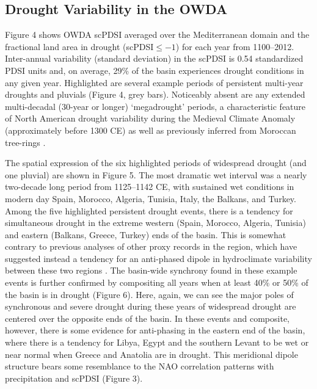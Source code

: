\documentclass[draft,jgr]{AGUTeX}
\begin{document}
\begin{article}
\subsection{Drought Variability in the OWDA}
\noindent Figure 4 shows OWDA scPDSI averaged over the Mediterranean domain and the fractional land area in drought (scPDSI$\le-1$) for each year from 1100--2012. Inter-annual variability (standard deviation) in the scPDSI is 0.54 standardized PDSI units and, on average, 29\% of the basin experiences drought conditions in any given year. Highlighted are several example periods of persistent multi-year droughts and pluvials (Figure 4, grey bars). Noticeably absent are any extended multi-decadal (30-year or longer) `megadrought' periods, a characteristic feature of North American drought variability during the Medieval Climate Anomaly (approximately before 1300 CE) \citep[e.g.,][]{CookER2010b} as well as previously inferred from Moroccan tree-rings \citep{Esper:etal2007a}.

\indent The spatial expression of the six highlighted periods of widespread drought (and one pluvial) are shown in Figure 5. The most dramatic wet interval was a nearly two-decade long period from 1125--1142 CE, with sustained wet conditions in modern day Spain, Morocco, Algeria, Tunisia, Italy, the Balkans, and Turkey. Among the five highlighted persistent drought events, there is a tendency for simultaneous drought in the extreme western (Spain, Morocco, Algeria, Tunisia) and eastern (Balkans, Greece, Turkey) ends of the basin. This is somewhat contrary to previous analyses of other proxy records in the region, which have suggested instead a tendency for an anti-phased dipole in hydroclimate variability between these two regions \citep[e.g.,][]{Roberts:etal2012}. The basin-wide synchrony found in these example events is further confirmed by compositing all years when at least 40\% or 50\% of the basin is in drought (Figure 6). Here, again, we can see the major poles of synchronous and severe drought during these years of widespread drought are centered over the opposite ends of the basin. In these events and composite, however, there is some evidence for anti-phasing in the eastern end of the basin, where there is a tendency for Libya, Egypt and the southern Levant to be wet or near normal when Greece and Anatolia are in drought. This meridional dipole structure bears some resemblance to the NAO correlation patterns with precipitation and scPDSI (Figure 3).


\end{article}
\end{document}
